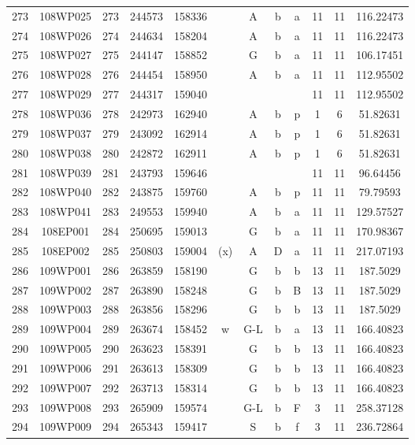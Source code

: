 \begin{tabular}{|*{12}{c|}}
273 & 108WP025 & 273 & 244573 & 158336 &  & A & b & a & 11 & 11 & 116.22473 \\ 
274 & 108WP026 & 274 & 244634 & 158204 &  & A & b & a & 11 & 11 & 116.22473 \\ 
275 & 108WP027 & 275 & 244147 & 158852 &  & G & b & a & 11 & 11 & 106.17451 \\ 
276 & 108WP028 & 276 & 244454 & 158950 &  & A & b & a & 11 & 11 & 112.95502 \\ 
277 & 108WP029 & 277 & 244317 & 159040 &  &  &  &  & 11 & 11 & 112.95502 \\ 
278 & 108WP036 & 278 & 242973 & 162940 &  & A & b & p & 1 & 6 & 51.82631 \\ 
279 & 108WP037 & 279 & 243092 & 162914 &  & A & b & p & 1 & 6 & 51.82631 \\ 
280 & 108WP038 & 280 & 242872 & 162911 &  & A & b & p & 1 & 6 & 51.82631 \\ 
281 & 108WP039 & 281 & 243793 & 159646 &  &  &  &  & 11 & 11 & 96.64456 \\ 
282 & 108WP040 & 282 & 243875 & 159760 &  & A & b & p & 11 & 11 & 79.79593 \\ 
283 & 108WP041 & 283 & 249553 & 159940 &  & A & b & a & 11 & 11 & 129.57527 \\ 
284 & 108EP001 & 284 & 250695 & 159013 &  & G & b & a & 11 & 11 & 170.98367 \\ 
285 & 108EP002 & 285 & 250803 & 159004 & (x) & A & D & a & 11 & 11 & 217.07193 \\ 
286 & 109WP001 & 286 & 263859 & 158190 &  & G & b & b & 13 & 11 & 187.5029 \\ 
287 & 109WP002 & 287 & 263890 & 158248 &  & G & b & B & 13 & 11 & 187.5029 \\ 
288 & 109WP003 & 288 & 263856 & 158296 &  & G & b & b & 13 & 11 & 187.5029 \\ 
289 & 109WP004 & 289 & 263674 & 158452 & w & G-L & b & a & 13 & 11 & 166.40823 \\ 
290 & 109WP005 & 290 & 263623 & 158391 &  & G & b & b & 13 & 11 & 166.40823 \\ 
291 & 109WP006 & 291 & 263613 & 158309 &  & G & b & b & 13 & 11 & 166.40823 \\ 
292 & 109WP007 & 292 & 263713 & 158314 &  & G & b & b & 13 & 11 & 166.40823 \\ 
293 & 109WP008 & 293 & 265909 & 159574 &  & G-L & b & F & 3 & 11 & 258.37128 \\ 
294 & 109WP009 & 294 & 265343 & 159417 &  & S & b & f & 3 & 11 & 236.72864 \\ 

\end{tabular}
